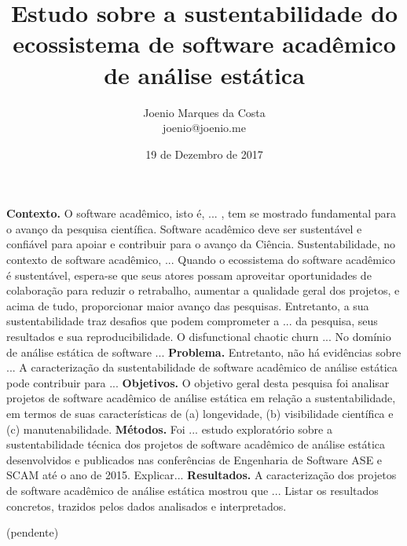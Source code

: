 \documentclass[msc, classic, a4paper]{ufbathesis}
\date{19 de Dezembro de 2017}
\title{
  Estudo sobre a sustentabilidade do ecossistema de software acadêmico de
  análise estática
}
\author{Joenio Marques da Costa\\
  {\small joenio@joenio.me}
}
\begin{document}
\frontpage
\frontmatter
\presentationpage

\resumo

\textbf{Contexto.} 
O software acadêmico, isto é, ... ,
tem se mostrado fundamental para o avanço da pesquisa científica.
Software acadêmico deve ser sustentável e confiável para apoiar e contribuir para o avanço da Ciência.
%
Sustentabilidade, no contexto de software acadêmico,  ...
%
Quando o ecossistema do software acadêmico é sustentável, espera-se que seus atores possam aproveitar
oportunidades de colaboração para reduzir o retrabalho, aumentar a qualidade
geral dos projetos, e acima de tudo, proporcionar maior avanço das pesquisas.
%
Entretanto, a sua sustentabilidade traz desafios que
podem comprometer a ... da pesquisa, seus resultados e sua reproducibilidade.
%
O disfunctional chaotic churn ...
%
No domínio de análise estática de software ...
%
\textbf{Problema.} 
Entretanto, não há evidências sobre ...
A caracterização da sustentabilidade de software acadêmico 
de análise estática pode contribuir para ...
%
\textbf{Objetivos.}
O objetivo geral desta pesquisa foi analisar projetos de software acadêmico de análise estática 
em relação a sustentabilidade, em termos de suas características de 
(a) longevidade, (b) visibilidade científica e (c) manutenabilidade.
%
\textbf{Métodos.}
Foi ... estudo exploratório sobre a sustentabilidade
técnica dos projetos de software acadêmico de análise estática desenvolvidos e
publicados nas conferências de Engenharia de Software ASE e SCAM até o ano de
2015.
Explicar...
%
\textbf{Resultados.}
A caracterização dos projetos de software acadêmico de análise estática
mostrou que ...
Listar os resultados concretos, trazidos pelos dados analisados e interpretados.

\begin{keywords}

  (pendente)

\end{keywords}
\end{document}
